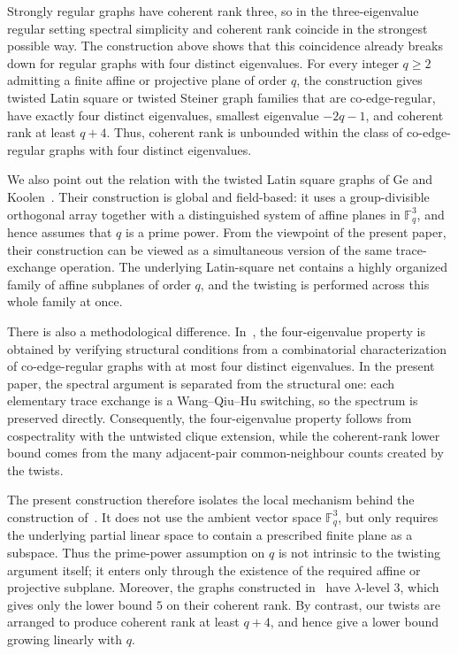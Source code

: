 \documentclass[reqno,a4paper,11pt]{article}
\theoremstyle{definition}
\theoremstyle{remark}
\begin{document}
Strongly regular graphs have coherent rank three, so in the
three-eigenvalue regular setting spectral simplicity and coherent rank coincide in the strongest possible way. 
 The construction above shows that this coincidence already breaks down for regular graphs with four distinct eigenvalues.
  For every integer \(q\ge2\) admitting a finite affine or projective plane of order \(q\), 
  the construction gives twisted Latin square or twisted Steiner graph families that are co-edge-regular, have exactly four distinct eigenvalues, smallest eigenvalue \(-2q-1\), and  coherent rank at least \(q+4\). 
Thus, coherent rank is unbounded within the class of
co-edge-regular graphs with four distinct eigenvalues.

We also point out the relation with the twisted Latin square graphs of
Ge and Koolen~\cite{GeKoolen2025}.  Their construction is global and
field-based: it uses a group-divisible orthogonal array together with a
distinguished system of affine planes in \(\mathbb F_q^3\), and hence
assumes that \(q\) is a prime power.  From the viewpoint of the present
paper, their construction can be viewed as a simultaneous version of the
same trace-exchange operation.  The underlying Latin-square net contains a
highly organized family of affine subplanes of order \(q\), and the
twisting is performed across this whole family at once.

There is also a methodological difference.  In~\cite{GeKoolen2025}, the
four-eigenvalue property is obtained by verifying structural conditions
from a combinatorial characterization of co-edge-regular graphs with at
most four distinct eigenvalues.  In the present paper, the spectral
argument is separated from the structural one: each elementary trace
exchange is a Wang--Qiu--Hu switching, so the spectrum is preserved
directly.  Consequently, the four-eigenvalue property follows from
cospectrality with the untwisted clique extension, while the coherent-rank
lower bound comes from the many adjacent-pair common-neighbour counts
created by the twists.

The present construction therefore isolates the local mechanism behind the construction of~\cite{GeKoolen2025}.  It does not use the
ambient vector space \(\mathbb F_q^3\), but only requires the underlying
partial linear space to contain a prescribed finite plane as a subspace.
Thus the prime-power assumption on \(q\) is not intrinsic to the twisting
argument itself; it enters only through the existence of the required affine or projective subplane.  
Moreover, the graphs constructed in~\cite{GeKoolen2025} have \(\lambda\)-level \(3\), which gives only the lower bound \(5\) on their coherent rank. 
By contrast, our twists are arranged to produce
coherent rank at least \(q+4\), and hence give a lower bound growing linearly
with \(q\).
\end{document}

